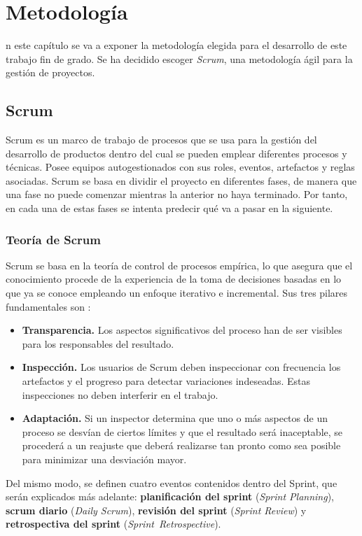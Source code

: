 \chapter{Metodología}
\label{chap:metodologia}

n este capítulo se va a exponer la metodología elegida para el desarrollo de este trabajo fin de grado. Se ha decidido escoger \textit{Scrum}, una metodología ágil para la gestión de proyectos.

\section{Scrum}
Scrum \cite{Schwaber2017} es un marco de trabajo de procesos que se usa para la gestión del desarrollo de productos dentro del cual se pueden emplear diferentes procesos y técnicas. Posee equipos autogestionados con sus roles, eventos, artefactos y reglas asociadas. Scrum se basa en dividir el proyecto en diferentes fases, de manera que una fase no puede comenzar mientras la anterior no haya terminado. Por tanto, en cada una de estas fases se intenta predecir qué va a pasar en la siguiente.

\subsection{Teoría de Scrum}
Scrum se basa en la teoría de control de procesos empírica, lo que asegura que el conocimiento procede de la experiencia de la toma de decisiones basadas en lo que ya se conoce empleando un enfoque iterativo e incremental. Sus tres pilares fundamentales son \cite{Schwaber2017}:

\begin{itemize}
	\item \textbf{Transparencia.} Los aspectos significativos del proceso han de ser visibles para los responsables del resultado.
	\item \textbf{Inspección.} Los usuarios de Scrum deben inspeccionar con frecuencia los artefactos y el progreso para detectar variaciones indeseadas. Estas inspecciones no deben interferir en el trabajo.
	\item \textbf{Adaptación.} Si un inspector determina que uno o más aspectos de un proceso se desvían de ciertos límites y que el resultado será inaceptable, se procederá a un reajuste que deberá realizarse tan pronto como sea posible para minimizar una desviación mayor.
\end{itemize}

Del mismo modo, se definen cuatro eventos contenidos dentro del Sprint, que serán explicados más adelante: \textbf{planificación del sprint} (\textit{Sprint Planning}), \textbf{scrum diario} (\textit{Daily Scrum}), \textbf{revisión del sprint} (\textit{Sprint Review}) y \textbf{retrospectiva del sprint} (\textit{\mbox{Sprint Retrospective}}).


